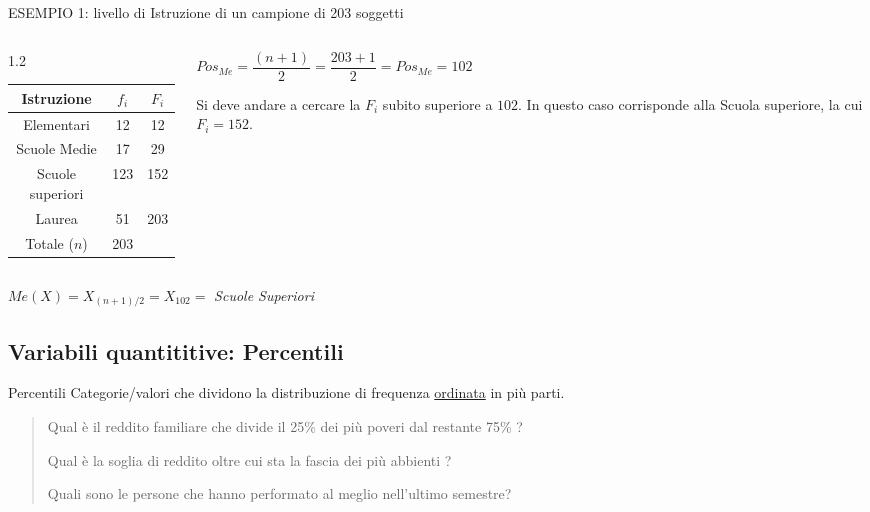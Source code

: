 \documentclass[compress]{beamer}
\newcommand\Factor{1.2}
\begin{document}
\begin{frame}
	\begin{block}{ESEMPIO 1: livello di Istruzione di un
			campione di 203 soggetti}
		
	\begin{columns}
		\begin{column}{.50\linewidth}
			\begin{spacing}\Factor
				\begin{table}
					\centering
					\begin{tabular}{|c|c|c|}
						\hline
					Istruzione	& $f_i$ & $F_i$ \\
					\hline
						Elementari & 12 & 12 \\
						Scuole Medie & 17 & 29 \\
						Scuole superiori & 123 & 152 \\
						Laurea & 51 & 203 \\
						\hline
						Totale ($n$) & 203 & \\
						\hline
					\end{tabular}
				\end{table}
			\end{spacing}
		\end{column}
	
\begin{column}{.50\linewidth}
	$Pos_{Me} = \dfrac{(n+1)}{2} = \dfrac{203+1}{2} = Pos_{Me} = 102$
	
	\vspace{5mm}
	
	Si deve andare a cercare la $F_i$ subito superiore a $102$. In questo caso corrisponde alla Scuola superiore, la cui $F_i = 152$. 
\end{column}

	\end{columns}
		\vspace{5mm}
		\centering
		$Me(X) = X_{(n+1)/2} = X_{102} =$ \emph{Scuole Superiori}
	\end{block}
\end{frame}

\subsection*{Variabili quantititive: Percentili}
\begin{frame}{Percentili}
	Categorie/valori che dividono la
	distribuzione di frequenza
	\underline{ordinata} in più parti.
\begin{quote}
	Qual è il reddito familiare che divide il 25\% dei più poveri dal restante 75\% ?
	
	Qual è la soglia di reddito oltre cui sta la fascia dei più
	abbienti ?
	
	Quali sono le persone che hanno performato al meglio nell'ultimo semestre?
\end{quote}
	
\end{frame}
\end{document}
